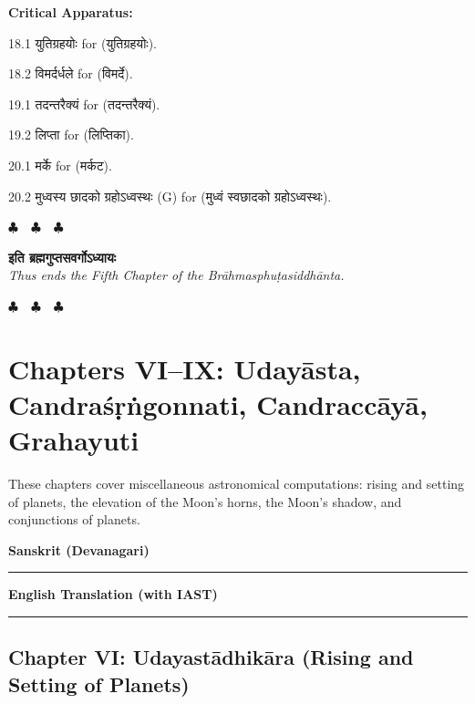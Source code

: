 \documentclass[11pt,a4paper]{article}
\newcommand{\dev}[1]{{\devanagarifont #1}}
\newcommand{\columnheaders}{%
  \noindent
  \begin{minipage}[t]{0.47\textwidth}
  \centering
  \textbf{\large Sanskrit (Devanagari)}\\[0.1cm]
  \rule{0.8\textwidth}{0.5pt}
  \end{minipage}%
  \hfill
  \begin{minipage}[t]{0.47\textwidth}
  \centering
  \textbf{\large English Translation (with IAST)}\\[0.1cm]
  \rule{0.8\textwidth}{0.5pt}
  \end{minipage}%
  \vspace{0.3cm}
  \par
}
\newenvironment{variants}{%
  \small%
  \color{varecolor}%
  \list{}{\leftmargin=2em\itemindent=-1em}%
}{\endlist}
\newcommand{\chapterend}{%
  \begin{center}%
  \textcolor{endmarkcolor}{$\clubsuit$~~$\clubsuit$~~$\clubsuit$}%
  \end{center}%
}
\begin{document}
\vspace{0.4cm}
\textcolor{varecolor}{\textbf{Critical Apparatus:}}
\begin{variants}
\item[18.1] \dev{युतिग्रहयोः} \dev{for} (\dev{युतिग्रहयोः}).
\item[18.2] \dev{विमर्दर्धले} \dev{for} (\dev{विमर्दे}).
\item[19.1] \dev{तदन्तरैक्यं} \dev{for} (\dev{तदन्तरैक्यं}).
\item[19.2] \dev{लिप्ता} \dev{for} (\dev{लिप्तिका}).
\item[20.1] \dev{मर्के} \dev{for} (\dev{मर्कट}).
\item[20.2] \dev{मुध्वस्य छादको ग्रहोऽध्वस्थः} (G) \dev{for} (\dev{मुध्वं स्वछादको ग्रहोऽध्वस्थः}).
\end{variants}

\vspace{0.5cm}
\chapterend
\begin{center}
\dev{\textbf{इति ब्रह्मगुप्तसवर्गोऽध्यायः}}\\[0.2cm]
\textit{Thus ends the Fifth Chapter of the Brāhmasphuṭasiddhānta.}
\end{center}
\chapterend

\newpage


\section*{Chapters VI--IX: Udayāsta, Candraśṛṅgonnati, Candraccāyā, Grahayuti}

These chapters cover miscellaneous astronomical computations: rising and setting
of planets, the elevation of the Moon's horns, the Moon's shadow, and conjunctions
of planets.

\vspace{0.3cm}
\columnheaders

\subsection*{Chapter VI: Udayastādhikāra (Rising and Setting of Planets)}
\end{document}
